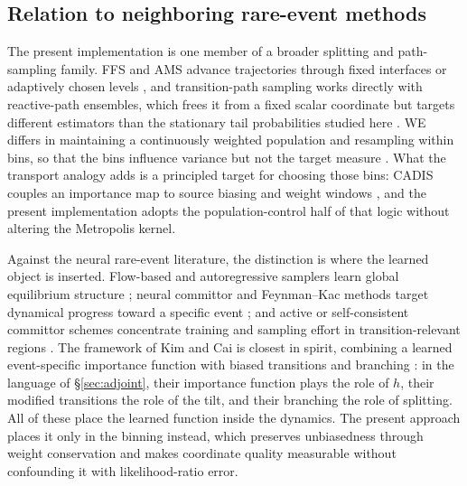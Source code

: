 \documentclass[a4paper,fleqn]{cas-sc}
\begin{document}
\subsection{Relation to neighboring rare-event methods}\label{sec:relation}
The present implementation is one member of a broader splitting and path-sampling family.
FFS and AMS advance trajectories through fixed interfaces or adaptively chosen levels
\citep{allen2009,valeriani2007,cerou2007}, and transition-path sampling works directly with
reactive-path ensembles, which frees it from a fixed scalar coordinate but targets different
estimators than the stationary tail probabilities studied here
\citep{chandler1978,dellago1998,bolhuis2002}. WE differs in maintaining a continuously weighted
population and resampling within bins, so that the bins influence variance but not the target
measure \citep{huber1996,zhang2010,zuckerman2017}. What the transport analogy adds is a
principled target for choosing those bins: CADIS couples an importance map to source biasing
and weight windows \citep{wagner1998,haghighat2003,wagnerfw2014}, and the present
implementation adopts the population-control half of that logic without altering the
Metropolis kernel.

Against the neural rare-event literature, the distinction is where the learned object is
inserted. Flow-based and autoregressive samplers learn global equilibrium structure
\citep{wu2019,noe2019,nicoli2020,gabrie2022}; neural committor and Feynman--Kac methods target
dynamical progress toward a specific event \citep{khoo2019,li2022,strahan2023}; and active or
self-consistent committor schemes concentrate training and sampling effort in
transition-relevant regions \citep{rotskoff2022,kang2024,trizio2025}. The framework of Kim and
Cai is closest in spirit, combining a learned event-specific importance function with biased
transitions and branching \citep{kimcai2026}: in the language of \S\ref{sec:adjoint}, their
importance function plays the role of $h$, their modified transitions the role of the tilt, and
their branching the role of splitting. All of these place the learned function inside the
dynamics. The present approach places it only in the binning instead, which preserves
unbiasedness through weight conservation and makes coordinate quality measurable without
confounding it with likelihood-ratio error.
\end{document}
